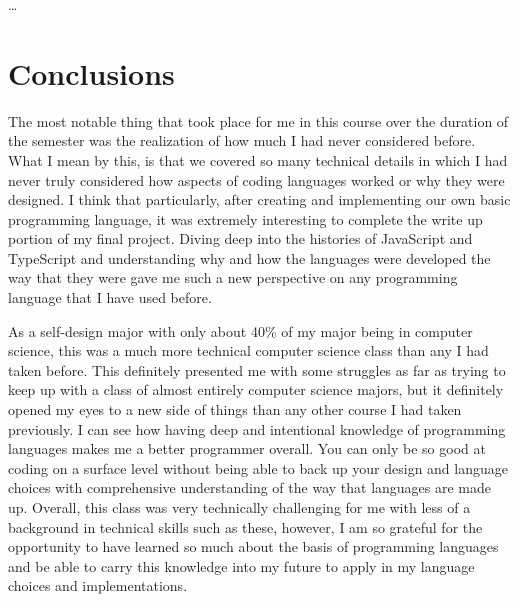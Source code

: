 \documentclass{article}
\theoremstyle{theorem}
\theoremstyle{definition}
\theoremstyle{remark}
\begin{document}
\ldots

\section{Conclusions}\label{conclusions}


The most notable thing that took place for me in this course over the duration of the semester was the realization of how much I had never considered before. What I mean by this, is that we covered so many technical details in which I had never truly considered how aspects of coding languages worked or why they were designed. I think that particularly, after creating and implementing our own basic programming language, it was extremely interesting to complete the write up portion of my final project. Diving deep into the histories of JavaScript and TypeScript and understanding why and how the languages were developed the way that they were gave me such a new perspective on any programming language that I have used before.

As a self-design major with only about 40\% of my major being in computer science, this was a much more technical computer science class than any I had taken before. This definitely presented me with some struggles as far as trying to keep up with a class of almost entirely computer science majors, but it definitely opened my eyes to a new side of things than any other course I had taken previously. I can see how having deep and intentional knowledge of programming languages makes me a better programmer overall. You can only be so good at coding on a surface level without being able to back up your design and language choices with comprehensive understanding of the way that languages are made up. Overall, this class was very technically challenging for me with less of a background in technical skills such as these, however, I am so grateful for the opportunity to have learned so much about the basis of programming languages and be able to carry this knowledge into my future to apply in my language choices and implementations.
\end{document}
